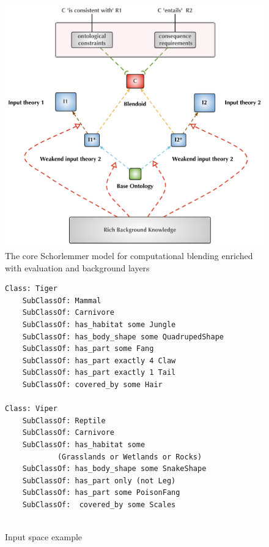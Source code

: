 \documentclass{ecai2012}
\begin{document}
 
 \begin{figure}[htbp]
\begin{center}
\includegraphics[width=0.9 \textwidth]{blendoids-coremodel}
\caption{The core Schorlemmer model for computational blending enriched with evaluation and background layers}
\label{blendingModel}
\end{center}
\end{figure}

 \begin{figure}[htbp]
\begin{lstlisting}[basicstyle=\ttfamily\scriptsize,language=dolText,morekeywords={props,excluding,ObjectProperty,Class,DisjointUnionOf,SubClassOf,Characteristics,Transitive,Asymmetric,SubPropertyOf,DisjointClasses,EquivalentTo,Asymmetric,inverse,only,forall,iff,if,or,exists,bridge,distributed},escapechar=@,mathescape,alsolanguage=owl2Manchester]
Class: Tiger 
	SubClassOf: Mammal 
	SubClassOf: Carnivore 
	SubClassOf: has_habitat some Jungle 	
	SubClassOf: has_body_shape some QuadrupedShape
	SubClassOf: has_part some Fang 
	SubClassOf: has_part exactly 4 Claw
	SubClassOf: has_part exactly 1 Tail  
	SubClassOf: covered_by some Hair
	
Class: Viper
	SubClassOf: Reptile 
	SubClassOf: Carnivore 
	SubClassOf: has_habitat some 
			(Grasslands or Wetlands or Rocks)
	SubClassOf: has_body_shape some SnakeShape
	SubClassOf: has_part only (not Leg)
	SubClassOf: has_part some PoisonFang
	SubClassOf:  covered_by some Scales 	
	
\end{lstlisting}
\caption{Input space example}
\label{inputExample}
\end{figure}
\vspace{-2em}
 
\end{document}
